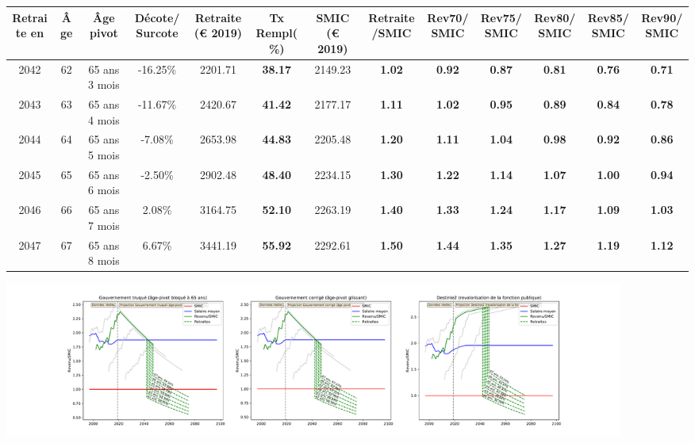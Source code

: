 { \scriptsize \begin{center} 
\begin{tabular}[htb]{|c|c||c|c||c|c||c||c|c|c|c|c|c|} 
\hline 
 Retraite en &  Âge &  Âge pivot &  Décote/Surcote &  Retraite (\euro{} 2019) &  Tx Rempl(\%) &  SMIC (\euro{} 2019) &  Retraite/SMIC &  Rev70/SMIC &  Rev75/SMIC &  Rev80/SMIC &  Rev85/SMIC &  Rev90/SMIC \\ 
\hline \hline 
 2042 &  62 &  65 ans 3 mois &  -16.25\% &  2201.71 &  {\bf 38.17} &  2149.23 &  {\bf 1.02} &  {\bf {\color{red} 0.92}} &  {\bf {\color{red} 0.87}} &  {\bf {\color{red} 0.81}} &  {\bf {\color{red} 0.76}} &  {\bf {\color{red} 0.71}} \\ 
\hline 
 2043 &  63 &  65 ans 4 mois &  -11.67\% &  2420.67 &  {\bf 41.42} &  2177.17 &  {\bf 1.11} &  {\bf 1.02} &  {\bf {\color{red} 0.95}} &  {\bf {\color{red} 0.89}} &  {\bf {\color{red} 0.84}} &  {\bf {\color{red} 0.78}} \\ 
\hline 
 2044 &  64 &  65 ans 5 mois &  -7.08\% &  2653.98 &  {\bf 44.83} &  2205.48 &  {\bf 1.20} &  {\bf 1.11} &  {\bf 1.04} &  {\bf {\color{red} 0.98}} &  {\bf {\color{red} 0.92}} &  {\bf {\color{red} 0.86}} \\ 
\hline 
 2045 &  65 &  65 ans 6 mois &  -2.50\% &  2902.48 &  {\bf 48.40} &  2234.15 &  {\bf 1.30} &  {\bf 1.22} &  {\bf 1.14} &  {\bf 1.07} &  {\bf 1.00} &  {\bf {\color{red} 0.94}} \\ 
\hline 
 2046 &  66 &  65 ans 7 mois &  2.08\% &  3164.75 &  {\bf 52.10} &  2263.19 &  {\bf 1.40} &  {\bf 1.33} &  {\bf 1.24} &  {\bf 1.17} &  {\bf 1.09} &  {\bf 1.03} \\ 
\hline 
 2047 &  67 &  65 ans 8 mois &  6.67\% &  3441.19 &  {\bf 55.92} &  2292.61 &  {\bf 1.50} &  {\bf 1.44} &  {\bf 1.35} &  {\bf 1.27} &  {\bf 1.19} &  {\bf 1.12} \\ 
\hline 
\hline 
\end{tabular} 
\end{center} } 

 \begin{center}\includegraphics[width=0.9\textwidth]{fig/ProfCertifie_1980_22_dest_retraite.pdf}\end{center} \label{fig/ProfCertifie_1980_22_dest_retraite.pdf} 

